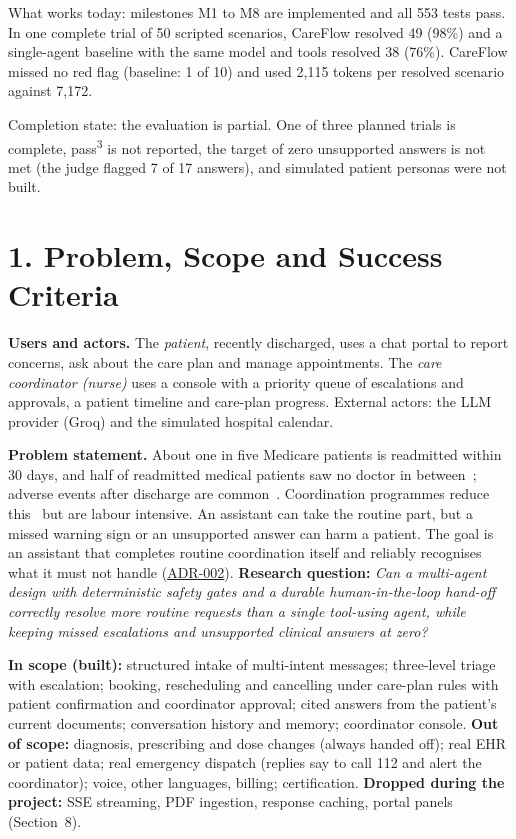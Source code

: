 \documentclass[10pt,a4paper]{article}
\newcommand{\repourl}{https://github.com/saideepaksana/careflow}
\newcommand{\rev}{cs5903-final-2026}
\newcommand{\adr}[1]{\href{\repourl/blob/\rev/docs/Architecture_Decision_Records.md}{ADR-#1}}
\begin{document}
What works today: milestones M1 to M8 are implemented and all 553 tests pass. In one complete trial of 50 scripted scenarios, CareFlow resolved 49 (98\%) and a single-agent baseline with the same model and tools resolved 38 (76\%). CareFlow missed no red flag (baseline: 1 of 10) and used 2,115 tokens per resolved scenario against 7,172.

Completion state: the evaluation is partial. One of three planned trials is complete, pass\textsuperscript{3} is not reported, the target of zero unsupported answers is not met (the judge flagged 7 of 17 answers), and simulated patient personas were not built.

\FloatBarrier
\section*{1. Problem, Scope and Success Criteria}

\textbf{Users and actors.} The \emph{patient}, recently discharged, uses a chat portal to report concerns, ask about the care plan and manage appointments. The \emph{care coordinator (nurse)} uses a console with a priority queue of escalations and approvals, a patient timeline and care-plan progress. External actors: the LLM provider (Groq) and the simulated hospital calendar.

\textbf{Problem statement.} About one in five Medicare patients is readmitted within 30 days, and half of readmitted medical patients saw no doctor in between~\cite{jencks}; adverse events after discharge are common~\cite{forster}. Coordination programmes reduce this~\cite{red,coleman} but are labour intensive. An assistant can take the routine part, but a missed warning sign or an unsupported answer can harm a patient. The goal is an assistant that completes routine coordination itself and reliably recognises what it must not handle (\adr{002}).
\textbf{Research question:} \emph{Can a multi-agent design with deterministic safety gates and a durable human-in-the-loop hand-off correctly resolve more routine requests than a single tool-using agent, while keeping missed escalations and unsupported clinical answers at zero?}

\textbf{In scope (built):} structured intake of multi-intent messages; three-level triage with escalation; booking, rescheduling and cancelling under care-plan rules with patient confirmation and coordinator approval; cited answers from the patient's current documents; conversation history and memory; coordinator console. \textbf{Out of scope:} diagnosis, prescribing and dose changes (always handed off); real EHR or patient data; real emergency dispatch (replies say to call 112 and alert the coordinator); voice, other languages, billing; certification. \textbf{Dropped during the project:} SSE streaming, PDF ingestion, response caching, portal panels (Section~8).
\end{document}

